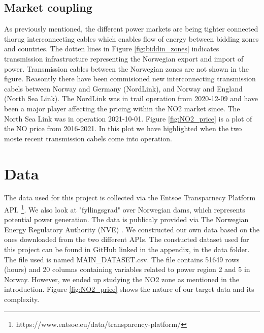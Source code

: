 \documentclass
[twocolumn,
secnumarabic,
nobibnotes,
aps,
prl,
reprint,
groupedaddress,
amsmath,
amssymb,
]{revtex4-2}
\begin{document}
\subsection{Market coupling}
As previously mentioned, the different power markets are being tighter connected thorug interconnecting cables which enables flow of energy between bidding zones and countries. The dotten lines in Figure \ref{fig:biddin_zones} indicates transmission infrastructure representing the Norwegian export and import of power. Transmission cables between the Norwegian zones are not shown in the figure. Reasontly there have been commisioned new interconnecting transmission cabels between Norway and Germany (NordLink), and Norway and England (North Sea Link). The NordLink was in trail operation from 2020-12-09 and have been a major player affecting the pricing within the NO2 market since. The North Sea Link was in operation 2021-10-01. Figure \ref{fig:NO2_price} is a plot of the NO price from 2016-2021. In this plot we have highlighted when the two moste recent transmission cabels come into operation.  

\section{Data}
The data used for this project is collected via the Entsoe Transparnecy Platform API. \footnote{https://www.entsoe.eu/data/transparency-platform/}. We also look at "fyllingsgrad" over Norwegian dams, which represents potential power generation. The data is publicaly provided via The Norwegian Energy Regulatory Authority (NVE) \cite{noauthor_magasinstatistikk_nodate}. 
We constructed our own data based on the ones downloaded from the two different APIs. The constucted dataset used for this project can be found in GitHub linked in the appendix, in the data folder. The file used is named MAIN\_DATASET.csv. The file contains 51649 rows (hours) and 20 columns containing variables related to power region 2 and 5 in Norway. However, we ended up studying the NO2 zone as mentioned in the introduction. Figure \ref{fig:NO2_price} shows the nature of our target data and its complexity. 
\end{document}
